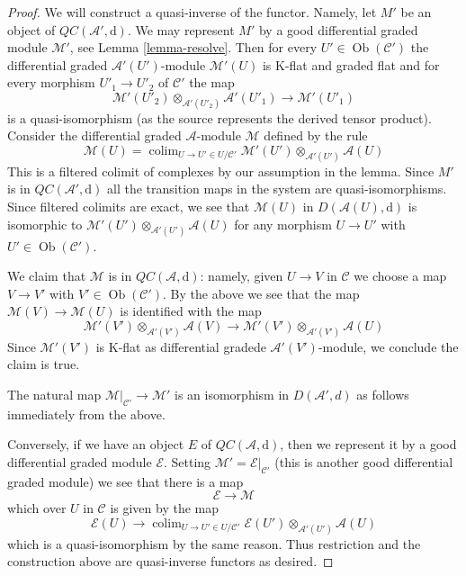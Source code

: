 \documentclass{stacks-project}
\theoremstyle{plain}
\theoremstyle{definition}
\theoremstyle{remark}
\numberwithin{equation}{subsection}
\def\colim{\mathop{\mathrm{colim}}\nolimits}
\def\Ob{\mathop{\mathrm{Ob}}\nolimits}
\begin{document}
\begin{proof}
We will construct a quasi-inverse of the functor. Namely,
let $M'$ be an object of $\mathit{QC}(\mathcal{A}', \text{d})$.
We may represent $M'$ by a good differential graded module $\mathcal{M}'$,
see Lemma \ref{lemma-resolve}. Then for every $U' \in \Ob(\mathcal{C}')$
the differential graded $\mathcal{A}'(U')$-module $\mathcal{M}'(U)$
is K-flat and graded flat and for every morphism $U'_1 \to U'_2$ of
$\mathcal{C}'$ the map
$$
\mathcal{M}'(U'_2) \otimes_{\mathcal{A}'(U'_2)} \mathcal{A}'(U'_1)
\longrightarrow
\mathcal{M}'(U'_1)
$$
is a quasi-isomorphism (as the source represents the derived tensor product).
Consider the differential graded
$\mathcal{A}$-module $\mathcal{M}$ defined by the rule
$$
\mathcal{M}(U) =
\colim_{U \to U' \in U/\mathcal{C}'}
\mathcal{M}'(U') \otimes_{\mathcal{A}'(U')} \mathcal{A}(U)
$$
This is a filtered colimit of complexes by our assumption in the lemma.
Since $M'$ is in $\mathit{QC}(\mathcal{A}', \text{d})$ all the
transition maps in the system are quasi-isomorphisms. Since filtered
colimits are exact, we see that
$\mathcal{M}(U)$ in $D(\mathcal{A}(U), \text{d})$
is isomorphic to $\mathcal{M}'(U') \otimes_{\mathcal{A}'(U')} \mathcal{A}(U)$
for any morphism $U \to U'$ with $U' \in \Ob(\mathcal{C}')$.

\medskip\noindent
We claim that $\mathcal{M}$ is in
$\mathit{QC}(\mathcal{A}, \text{d})$: namely, given $U \to V$ in
$\mathcal{C}$ we choose a map $V \to V'$ with $V' \in \Ob(\mathcal{C}')$.
By the above we see that the map $\mathcal{M}(V) \to \mathcal{M}(U)$
is identified with the map
$$
\mathcal{M}'(V') \otimes_{\mathcal{A}'(V')} \mathcal{A}(V)
\longrightarrow
\mathcal{M}'(V') \otimes_{\mathcal{A}'(V')} \mathcal{A}(U)
$$
Since $\mathcal{M'}(V')$ is K-flat as
differential gradede $\mathcal{A}'(V')$-module, we conclude
the claim is true.

\medskip\noindent
The natural map $\mathcal{M}|_{\mathcal{C}'} \to \mathcal{M}'$ is an
isomorphism in $D(\mathcal{A}', d)$ as follows immediately from the above.

\medskip\noindent
Conversely, if we have an object $E$ of $\mathit{QC}(\mathcal{A}, \text{d})$,
then we represent it by a good differential graded module $\mathcal{E}$.
Setting $\mathcal{M}' = \mathcal{E}|_{\mathcal{C}'}$ (this is another good
differential graded module) we see that there is a map
$$
\mathcal{E} \to \mathcal{M}
$$
which over $U$ in $\mathcal{C}$ is given by the map
$$
\mathcal{E}(U)
\longrightarrow
\colim_{U \to U' \in U/\mathcal{C}'}
\mathcal{E}(U') \otimes_{\mathcal{A}'(U')} \mathcal{A}(U)
$$
which is a quasi-isomorphism by the same reason. Thus restriction and
the construction above are quasi-inverse functors as desired.
\end{proof}
\end{document}
